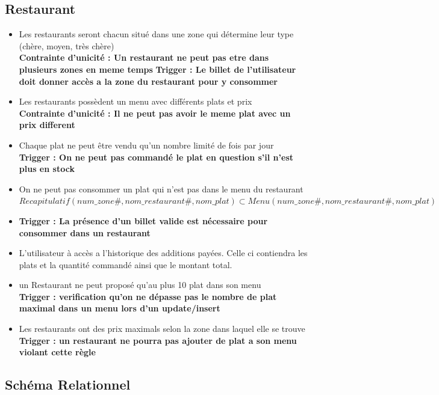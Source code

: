 \documentclass{article}
\begin{document}
\subsection{Restaurant}
\begin{itemize}
    \item Les restaurants seront chacun situé dans une zone qui détermine leur type (chère, moyen, très chère) \\
    \textbf{Contrainte d'unicité  : Un restaurant ne peut pas etre dans plusieurs zones en meme temps}
    \textbf{Trigger : Le billet de l'utilisateur doit donner accès a la zone du restaurant pour y consommer}
    \item Les restaurants possèdent un menu avec différents plats et prix \\
    \textbf{Contrainte d'unicité  : Il ne peut pas avoir le meme plat avec un prix different}
    \item Chaque plat ne peut être vendu qu'un nombre limité de fois par jour\\
    \textbf{Trigger : On ne peut pas commandé le plat en question s'il n'est plus en stock}
    \item On ne peut pas consommer un plat qui n'est pas dans le menu du restaurant \\
    $ Recapitulatif(num\_zone\#, nom\_restaurant\#, nom\_plat) \subset  Menu(num\_zone\#, nom\_restaurant\#,nom\_plat) $
    \item \textbf{Trigger : La présence d'un billet valide est nécessaire pour consommer dans un restaurant }
    \item L'utilisateur à accès a l'historique des additions payées. Celle ci contiendra les plats et la quantité commandé ainsi que le montant total.
    \item un Restaurant ne peut proposé qu'au plus 10 plat dans son menu \\
    \textbf{Trigger : verification qu'on ne dépasse pas le nombre de plat maximal dans un menu lors d'un update/insert}
    \item Les restaurants ont des prix maximals selon la zone dans laquel elle se trouve\\
    \textbf{Trigger : un restaurant ne pourra pas ajouter de plat a son menu violant cette règle }
\end{itemize}


\subsection{Schéma Relationnel}
\end{document}
